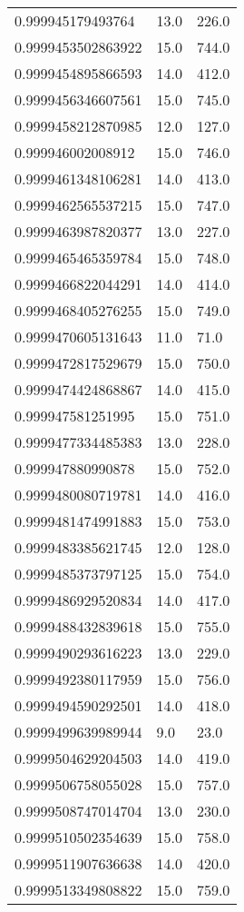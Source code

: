 \begin{center}
\begin{supertabular}[H]{p{0.30\textwidth}p{0.05\textwidth}p{0.05\textwidth}}
0.999945179493764 & 13.0 & 226.0 \\ 
0.9999453502863922 & 15.0 & 744.0 \\ 
0.9999454895866593 & 14.0 & 412.0 \\ 
0.9999456346607561 & 15.0 & 745.0 \\ 
0.9999458212870985 & 12.0 & 127.0 \\ 
0.999946002008912 & 15.0 & 746.0 \\ 
0.9999461348106281 & 14.0 & 413.0 \\ 
0.9999462565537215 & 15.0 & 747.0 \\ 
0.9999463987820377 & 13.0 & 227.0 \\ 
0.9999465465359784 & 15.0 & 748.0 \\ 
0.9999466822044291 & 14.0 & 414.0 \\ 
0.9999468405276255 & 15.0 & 749.0 \\ 
0.9999470605131643 & 11.0 & 71.0 \\ 
0.9999472817529679 & 15.0 & 750.0 \\ 
0.9999474424868867 & 14.0 & 415.0 \\ 
0.999947581251995 & 15.0 & 751.0 \\ 
0.9999477334485383 & 13.0 & 228.0 \\ 
0.999947880990878 & 15.0 & 752.0 \\ 
0.9999480080719781 & 14.0 & 416.0 \\ 
0.9999481474991883 & 15.0 & 753.0 \\ 
0.9999483385621745 & 12.0 & 128.0 \\ 
0.9999485373797125 & 15.0 & 754.0 \\ 
0.9999486929520834 & 14.0 & 417.0 \\ 
0.9999488432839618 & 15.0 & 755.0 \\ 
0.9999490293616223 & 13.0 & 229.0 \\ 
0.9999492380117959 & 15.0 & 756.0 \\ 
0.9999494590292501 & 14.0 & 418.0 \\ 
0.9999499639989944 & 9.0 & 23.0 \\ 
0.9999504629204503 & 14.0 & 419.0 \\ 
0.9999506758055028 & 15.0 & 757.0 \\ 
0.9999508747014704 & 13.0 & 230.0 \\ 
0.9999510502354639 & 15.0 & 758.0 \\ 
0.9999511907636638 & 14.0 & 420.0 \\ 
0.9999513349808822 & 15.0 & 759.0 \\ 

\end{supertabular}
\end{center}
